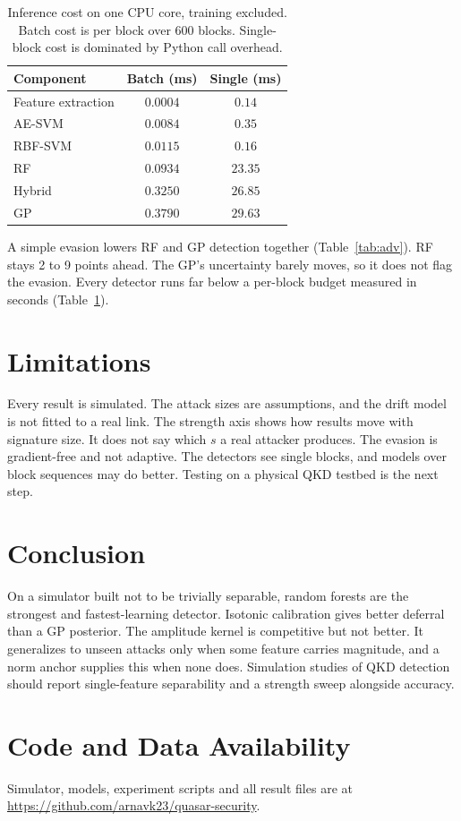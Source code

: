 \documentclass[conference,10pt]{IEEEtran}
\begin{document}
\begin{table}[t]
  \centering
  \caption{Inference cost on one CPU core, training excluded. Batch cost is per block over 600 blocks. Single-block cost is dominated by Python call overhead.}
  \label{tab:latency}
  \footnotesize
  \begin{tabular}{lcc}
    \toprule
    Component & Batch (ms) & Single (ms) \\
    \midrule
    Feature extraction & $0.0004$ & $0.14$ \\
    AE-SVM & $0.0084$ & $0.35$ \\
    RBF-SVM & $0.0115$ & $0.16$ \\
    RF & $0.0934$ & $23.35$ \\
    Hybrid & $0.3250$ & $26.85$ \\
    GP & $0.3790$ & $29.63$ \\
    \bottomrule
  \end{tabular}
\end{table}

A simple evasion lowers RF and GP detection together (Table~\ref{tab:adv}). RF
stays 2 to 9 points ahead. The GP's uncertainty barely moves, so it does not flag
the evasion. Every detector runs far below a per-block budget measured in seconds
(Table~\ref{tab:latency}).

\section{Limitations}

Every result is simulated. The attack sizes are assumptions, and the drift model
is not fitted to a real link. The strength axis shows how results move with
signature size. It does not say which $s$ a real attacker produces. The evasion is
gradient-free and not adaptive. The detectors see single blocks, and models over
block sequences may do better. Testing on a physical QKD testbed is the next step.

\section{Conclusion}

On a simulator built not to be trivially separable, random forests are the
strongest and fastest-learning detector. Isotonic calibration gives better
deferral than a GP posterior. The amplitude kernel is competitive but not better.
It generalizes to unseen attacks only when some feature carries magnitude, and a
norm anchor supplies this when none does. Simulation studies of QKD detection
should report single-feature separability and a strength sweep alongside
accuracy.

\section*{Code and Data Availability}
Simulator, models, experiment scripts and all result files are at
\url{https://github.com/arnavk23/quasar-security}.



\end{document}
